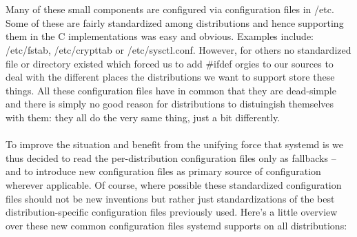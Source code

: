 \documentclass[titlepage]{article}
\begin{document}
\\
\\
Many of these small components are configured via configuration files in /etc. Some of these are fairly standardized among distributions and hence supporting them in the C implementations was easy and obvious. Examples include: /etc/fstab, /etc/crypttab or /etc/sysctl.conf. However, for others no standardized file or directory existed which forced us to add #ifdef orgies to our sources to deal with the different places the distributions we want to support store these things. All these configuration files have in common that they are dead-simple and there is simply no good reason for distributions to distuingish themselves with them: they all do the very same thing, just a bit differently.
\\
\\
To improve the situation and benefit from the unifying force that systemd is we thus decided to read the per-distribution configuration files only as fallbacks -- and to introduce new configuration files as primary source of configuration wherever applicable. Of course, where possible these standardized configuration files should not be new inventions but rather just standardizations of the best distribution-specific configuration files previously used. Here's a little overview over these new common configuration files systemd supports on all distributions:
\end{document}
